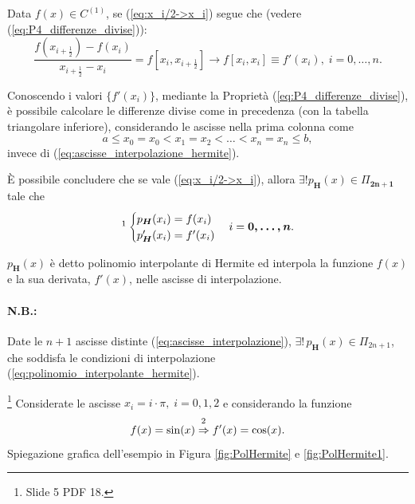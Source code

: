 Data $f(x)\in C^{(1)}$, se (\ref{eq:x_i/2->x_i}) segue che (vedere (\ref{eq:P4_differenze_divise})):
\begin{equation}\label{eq:equivalenza_approx_f'_hermite}
    \frac{f\left(x_{i+\frac{1}{2}}\right)-f(x_i)}{x_{i+\frac{1}{2}}-x_i}=f\left[x_i,x_{i+\frac{1}{2}}\right]\rightarrow f[x_i,x_i]\equiv f'(x_i),\; i=0,\hdots,n.
\end{equation}

Conoscendo i valori $\{f'(x_i)\}$, mediante la Proprietà (\ref{eq:P4_differenze_divise}), è possibile calcolare le differenze divise come in precedenza (con la tabella triangolare inferiore), considerando le ascisse nella prima colonna come
\begin{equation*}
	a \leq x_0 = x_0 < x_1 = x_2 < \hdots < x_n = x_n \leq b,
\end{equation*}
invece di (\ref{eq:ascisse_interpolazione_hermite}).

È possibile concludere che se vale (\ref{eq:x_i/2->x_i}), allora $\exists! p_{\boldsymbol H}(x)\in\Pi_{\boldsymbol{2n+1}}$ tale che
\begin{equation}\label{eq:polinomio_interpolante_hermite}
    \footnotemark\begin{cases}
        p_{\boldsymbol H}(x_i)=f(x_i)\\
        p_{\boldsymbol H}'(x_i)=f'(x_i)
    \end{cases} i=\boldsymbol{0,\hdots,n}.
\end{equation}

\begin{definition}
    $p_{\boldsymbol H}(x)$ è detto polinomio interpolante di Hermite ed interpola la funzione $f(x)$ e la sua derivata, $f'(x)$, nelle ascisse di interpolazione.
\end{definition}

\paragraph{N.B.:} Date le $n+1$ ascisse distinte (\ref{eq:ascisse_interpolazione}), $\exists!\, p_{\boldsymbol H}(x)\in\Pi_{2n+1}$, che soddisfa le condizioni di interpolazione (\ref{eq:polinomio_interpolante_hermite}).

\begin{example}\footnote{Slide 5 PDF 18.}
    Considerate le ascisse $x_i=i\cdot\pi,\; i=0,1,2$ e considerando la funzione
    \begin{equation*}
        f(x)=\sin(x)\overset{\footnotemark}{\Rightarrow}f'(x)=\cos(x).
    \end{equation*}
    Spiegazione grafica dell'esempio in Figura \ref{fig:PolHermite} e \ref{fig:PolHermite1}. 
\end{example}

